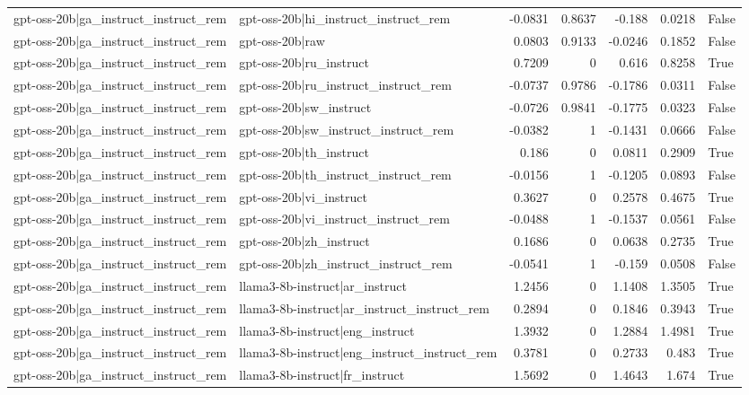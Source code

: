 \begin{table}
\begin{tabular}{l l r r r r l}
gpt-oss-20b|ga_instruct_instruct_rem & gpt-oss-20b|hi_instruct_instruct_rem & -0.0831 & 0.8637 & -0.188 & 0.0218 & False \\
gpt-oss-20b|ga_instruct_instruct_rem & gpt-oss-20b|raw & 0.0803 & 0.9133 & -0.0246 & 0.1852 & False \\
gpt-oss-20b|ga_instruct_instruct_rem & gpt-oss-20b|ru_instruct & 0.7209 & 0 & 0.616 & 0.8258 & True \\
gpt-oss-20b|ga_instruct_instruct_rem & gpt-oss-20b|ru_instruct_instruct_rem & -0.0737 & 0.9786 & -0.1786 & 0.0311 & False \\
gpt-oss-20b|ga_instruct_instruct_rem & gpt-oss-20b|sw_instruct & -0.0726 & 0.9841 & -0.1775 & 0.0323 & False \\
gpt-oss-20b|ga_instruct_instruct_rem & gpt-oss-20b|sw_instruct_instruct_rem & -0.0382 & 1 & -0.1431 & 0.0666 & False \\
gpt-oss-20b|ga_instruct_instruct_rem & gpt-oss-20b|th_instruct & 0.186 & 0 & 0.0811 & 0.2909 & True \\
gpt-oss-20b|ga_instruct_instruct_rem & gpt-oss-20b|th_instruct_instruct_rem & -0.0156 & 1 & -0.1205 & 0.0893 & False \\
gpt-oss-20b|ga_instruct_instruct_rem & gpt-oss-20b|vi_instruct & 0.3627 & 0 & 0.2578 & 0.4675 & True \\
gpt-oss-20b|ga_instruct_instruct_rem & gpt-oss-20b|vi_instruct_instruct_rem & -0.0488 & 1 & -0.1537 & 0.0561 & False \\
gpt-oss-20b|ga_instruct_instruct_rem & gpt-oss-20b|zh_instruct & 0.1686 & 0 & 0.0638 & 0.2735 & True \\
gpt-oss-20b|ga_instruct_instruct_rem & gpt-oss-20b|zh_instruct_instruct_rem & -0.0541 & 1 & -0.159 & 0.0508 & False \\
gpt-oss-20b|ga_instruct_instruct_rem & llama3-8b-instruct|ar_instruct & 1.2456 & 0 & 1.1408 & 1.3505 & True \\
gpt-oss-20b|ga_instruct_instruct_rem & llama3-8b-instruct|ar_instruct_instruct_rem & 0.2894 & 0 & 0.1846 & 0.3943 & True \\
gpt-oss-20b|ga_instruct_instruct_rem & llama3-8b-instruct|eng_instruct & 1.3932 & 0 & 1.2884 & 1.4981 & True \\
gpt-oss-20b|ga_instruct_instruct_rem & llama3-8b-instruct|eng_instruct_instruct_rem & 0.3781 & 0 & 0.2733 & 0.483 & True \\
gpt-oss-20b|ga_instruct_instruct_rem & llama3-8b-instruct|fr_instruct & 1.5692 & 0 & 1.4643 & 1.674 & True \\

\end{tabular}
\end{table}
